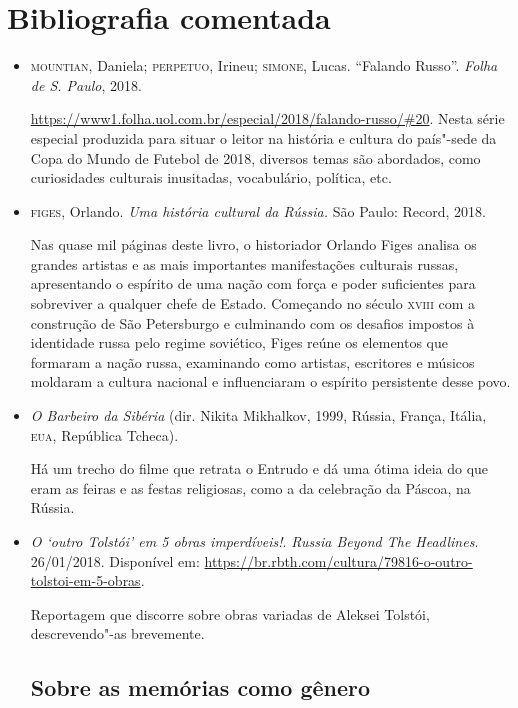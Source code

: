 \documentclass[11pt]{extarticle}
\begin{document}
\section{Bibliografia comentada}

\begin{itemize}
\item\textsc{mountian}, Daniela; \textsc{perpetuo}, Irineu; \textsc{simone}, Lucas. ``Falando Russo''. \emph{Folha de S. Paulo}, 2018.

\url{https://www1.folha.uol.com.br/especial/2018/falando-russo/\#20}.
Nesta série especial produzida para situar o leitor na história e
cultura do país"-sede da Copa do Mundo de Futebol de 2018, diversos temas
são abordados, como curiosidades culturais inusitadas, vocabulário,
política, etc.

\item\textsc{figes}, Orlando. \emph{Uma história cultural da Rússia.} São Paulo:
Record, 2018. 

Nas quase mil páginas deste livro, o historiador
Orlando Figes analisa os grandes artistas e as mais importantes
manifestações culturais russas, apresentando o espírito de uma nação com
força e poder suficientes para sobreviver a qualquer chefe de Estado.
Começando no século \textsc{xviii} com a construção de São Petersburgo e
culminando com os desafios impostos à identidade russa pelo regime
soviético, Figes reúne os elementos que formaram a nação russa,
examinando como artistas, escritores e músicos moldaram a cultura
nacional e influenciaram o espírito persistente desse povo.

\item\emph{O Barbeiro da Sibéria} (dir. Nikita Mikhalkov, 1999, Rússia,
França, Itália, \textsc{eua}, República Tcheca).

Há um trecho do filme que
retrata o Entrudo e dá uma ótima ideia do que eram as feiras e as festas
religiosas, como a da celebração da Páscoa, na Rússia.

\item\emph{O `outro Tolstói' em 5 obras imperdíveis!}. \emph{Russia Beyond
The Headlines}. 26/01/2018. Disponível em:
\url{https://br.rbth.com/cultura/79816-o-outro-tolstoi-em-5-obras}.


Reportagem que discorre sobre obras variadas de Aleksei Tolstói,
descrevendo"-as brevemente.

\subsection{Sobre as memórias como gênero}


\end{itemize}
\end{document}
